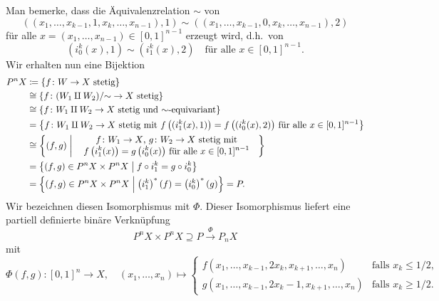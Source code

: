 Man bemerke, dass die Äquivalenzrelation $\sim$ von
\[
        ( (x_1, \dotsc, x_{k-1}, 1, x_k, \dotsc, x_{n-1}), 1)
  \sim  ( (x_1, \dotsc, x_{k-1}, 0, x_k, \dotsc, x_{n-1}), 2)
\]
für alle $x = (x_1, \dotsc, x_{n-1}) \in [0,1]^{n-1}$ erzeugt wird, d.h.\ von
\[
  \left( i_0^k(x), 1 \right) \sim \left( i_1^k(x), 2 \right)
  \quad
  \text{für alle $x \in [0,1]^{n-1}$}.
\]
Wir erhalten nun eine Bijektion
\begin{align*}
              P^n X
  &\coloneqq  \left\{
                \text{$f \colon W \to X$ stetig}
              \right\}
  \\
  &\cong      \left\{
                \text{$f \colon (W_1 \amalg W_2)/{\sim} \to X$ stetig}
              \right\}
  \\
  &\cong      \left\{
                \text{$f \colon W_1 \amalg W_2 \to X$ stetig und $\sim$-equivariant}
              \right\}
  \\
  &=          \left\{
                \text{$f \colon W_1 \amalg W_2 \to X$ stetig
                      mit $f\left( ( i_1^k(x), 1) \right) = f\left( ( i_0^k(x), 2) \right)$ für alle $x \in [0,1]^{n-1}$}
              \right\}
  \\
  &\cong      \left\{
                (f, g)
               \suchthatscale
                \text{
                \begin{tabular}{c}
                  $f \colon W_1 \to X$, $g \colon W_2 \to X$ stetig mit
                \\
                  $f\left( i_1^k(x) \right) = g\left( i_0^k(x) \right)$ für alle $x \in [0,1]^{n-1}$
                \end{tabular}
                }
              \right\}
  \\
  &=          \left\{
                (f, g) \in P^n X \times P^n X
              \suchthatscale
                f \circ i_1^k = g \circ i_0^k
              \right\}
  \\
  &=          \left\{
                (f, g) \in P^n X \times P^n X
              \suchthatscale
                \left( i_1^k \right)^*(f) = \left( i_0^k \right)^*(g)
              \right\}
  =           P.
\end{align*}
Wir bezeichnen diesen Isomorphismus mit $\Phi$.
Dieser Isomorphismus liefert eine partiell definierte binäre Verknüpfung
\[
                      P^n X \times P^n X
  \supseteq           P
  \xrightarrow{\Phi}  P_n X
\]
mit
\[
          \Phi(f,g)
  \colon  [0,1]^n
  \to     X,
  \quad   (x_1, \dotsc, x_n)
  \mapsto \begin{cases}
            f(x_1, \dotsc, x_{k-1}, 2x_k, x_{k+1}, \dotsc, x_n)     & \text{falls $x_k \leq 1/2$},  \\
            g(x_1, \dotsc, x_{k-1}, 2x_k - 1, x_{k+1}, \dotsc, x_n) & \text{falls $x_k \geq 1/2$}.
          \end{cases}
\]


